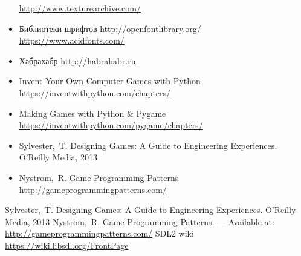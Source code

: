 \begin{itemize}
        \url{http://www.texturearchive.com/}
    \item Библиотеки шрифтов \url{http://openfontlibrary.org/}\\
        \url{https://www.acidfonts.com/}
    \item Хабрахабр \url{http://habrahabr.ru}
    \item Invent Your Own Computer Games with Python\\
        \url{https://inventwithpython.com/chapters/}
    \item Making Games with Python \& Pygame\\
        \url{https://inventwithpython.com/pygame/chapters/}
    \item Sylvester,~T. Designing Games: A Guide to Engineering Experiences. O'Reilly Media, 2013
    \item Nystrom,~R. Game Programming Patterns \url{http://gameprogrammingpatterns.com/}
\end{itemize}

\renewcommand{\bibname}{Список используемой литературы}
\begin{thebibliography}{10}
     Sylvester,~T. Designing Games: A Guide to Engineering Experiences. O'Reilly Media, 2013 
     Nystrom,~R. Game Programming Patterns. --- Available at: 
        \url{http://gameprogrammingpatterns.com/}
     SDL2 wiki \url{https://wiki.libsdl.org/FrontPage}
\end{thebibliography}